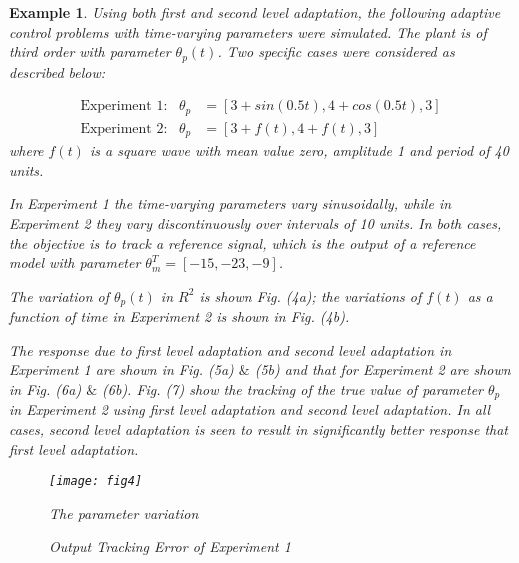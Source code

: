 \documentclass[conference]{IEEEtran}
\newtheorem{Example}{Example}
\begin{document}
\begin{Example}
Using both first and second level adaptation, the following adaptive control problems with time-varying parameters were simulated. The plant is of third order with parameter $\theta_{p}(t)$. Two specific cases were considered as described below:

\begin{equation*}
\begin{split}
\text{Experiment 1}:\ \ \ \theta_{p}&=[3+sin(0.5t),4+cos(0.5t),3]\\
 \text{Experiment 2}:\ \ \ \theta_{p}&=[3+f(t),4+f(t),3]
\end{split}
\end{equation*}
where $f(t)$ is a square wave with mean value zero, amplitude 1 and period of 40 units.

In Experiment 1 the time-varying parameters vary sinusoidally, while in Experiment 2 they vary discontinuously over intervals of 10 units. In both cases, the objective is to track a reference signal, which is the output of a reference model with parameter $\theta_{m}^{T}=[-15,-23,-9]$.

The variation of $\theta_{p}(t)$ in $R^{2}$ is shown Fig. (4a); the variations of $f(t)$ as a function of time in Experiment 2 is shown in Fig. (4b).

The response due to first level adaptation and second level adaptation in Experiment 1 are shown in Fig. (5a) $\&$ (5b) and that for Experiment 2 are shown in Fig. (6a) $\&$ (6b). Fig. (7) show the tracking of the true value of parameter $\theta_{p}$ in Experiment 2 using first level adaptation and second level adaptation. In all cases, second level adaptation is seen to result in significantly better response that first level adaptation.

\begin{figure}[H]
  \centering
  \texttt{[image: fig4]}\\	
  \caption{The parameter variation}
  \label{Fig4}
\end{figure}

\begin{figure}[H]
\centering
{}
\caption{Output Tracking Error of Experiment 1}
\end{figure}


\end{Example}
\end{document}
